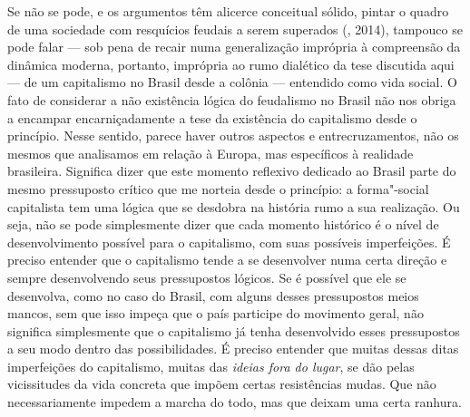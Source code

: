 Se não se
pode, e os argumentos têm alicerce conceitual sólido, pintar o quadro de
uma sociedade com resquícios feudais a serem superados (, 2014),
tampouco se pode falar --- sob pena de recair numa generalização
imprópria à compreensão da dinâmica moderna, portanto, imprópria ao rumo
dialético da tese discutida aqui --- de um capitalismo no Brasil desde a colônia
--- entendido como vida social. O fato de considerar a não
existência lógica do feudalismo no Brasil não nos obriga a encampar
encarniçadamente a tese da existência do capitalismo desde o princípio.
Nesse sentido, parece haver outros aspectos e entrecruzamentos, não os
mesmos que analisamos em relação à Europa, mas específicos à realidade
brasileira. Significa dizer que este momento reflexivo dedicado ao Brasil parte do
mesmo pressuposto crítico que me norteia desde o princípio: a
forma"-social capitalista tem uma lógica que se desdobra na história rumo
a sua realização. Ou seja, não se pode simplesmente dizer que cada
momento histórico é o nível de desenvolvimento possível para o
capitalismo, com suas possíveis imperfeições. É preciso entender que o
capitalismo tende a se desenvolver numa certa direção e sempre
desenvolvendo seus pressupostos lógicos. Se é possível que ele se
desenvolva, como no caso do Brasil, com alguns desses pressupostos
meios mancos, sem que isso impeça que o país participe do movimento
geral, não significa simplesmente que o capitalismo já tenha
desenvolvido esses pressupostos a seu modo dentro das possibilidades. É
preciso entender que muitas dessas ditas imperfeições do capitalismo,
muitas das \emph{ideias fora do lugar}, se dão pelas vicissitudes da
vida concreta que impõem certas resistências mudas. Que não
necessariamente impedem a marcha do todo, mas que deixam uma certa
ranhura.

